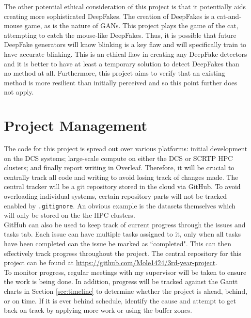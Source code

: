 \documentclass{article}
\begin{document}
The other potential ethical consideration of this project is that it potentially aids creating more sophisticated DeepFakes. The creation of DeepFakes is a cat-and-mouse game, as is the nature of GANs. This project plays the game of the cat, attempting to catch the mouse-like DeepFakes. Thus, it is possible that future DeepFake generators will know blinking is a key flaw and will specifically train to have accurate blinking. This is an ethical flaw in creating any DeepFake detectors and it is better to have at least a temporary solution to detect DeepFakes than no method at all. Furthermore, this project aims to verify that an existing method is more resilient than initially perceived and so this point further does not apply.

\section{Project Management}

The code for this project is spread out over various platforms: initial development on the DCS systems; large-scale compute on either the DCS or SCRTP HPC clusters; and finally report writing in Overleaf. Therefore, it will be crucial to centrally track all code and writing to avoid losing track of changes made. The central tracker will be a git repository stored in the cloud via GitHub. To avoid overloading individual systems, certain repository parts will not be tracked enabled by \verb|.gitignore|. An obvious example is the datasets themselves which will only be stored on the the HPC clusters.\\

GitHub can also be used to keep track of current progress through the issues and tasks tab. Each issue can have multiple tasks assigned to it, only when all tasks have been completed can the issue be marked as ``completed". This can then effectively track progress throughout the project. The central repository for this project can be found at \url{https://github.com/Mole1424/3rd-year-project}.\\

To monitor progress, regular meetings with my supervisor will be taken to ensure the work is being done. In addition, progress will be tracked against the Gantt charts in Section \ref{sec:timeline} to determine whether the project is ahead, behind, or on time. If it is ever behind schedule, identify the cause and attempt to get back on track by applying more work or using the buffer zones.\\



\end{document}
